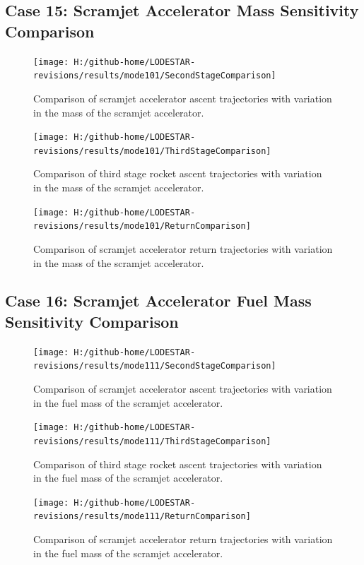 \subsection{Case 15: Scramjet Accelerator Mass Sensitivity Comparison}\label{sec:app_comparison101}
\begin{figure}[!th]
\centering
\texttt{[image: H:/github-home/LODESTAR-revisions/results/mode101/SecondStageComparison]}
\caption{Comparison of scramjet accelerator ascent trajectories with variation in the mass of the scramjet accelerator.}
\label{fig:SecondStageComparison12}
\end{figure}
\begin{figure}[!th]
\centering
\texttt{[image: H:/github-home/LODESTAR-revisions/results/mode101/ThirdStageComparison]}
\caption{Comparison of third stage rocket ascent trajectories with variation in the mass of the scramjet accelerator.}
\label{fig:ThirdStageComparison12}
\end{figure}
\begin{figure}[!th]
\centering
\texttt{[image: H:/github-home/LODESTAR-revisions/results/mode101/ReturnComparison]}
\caption{Comparison of scramjet accelerator return trajectories with variation in the mass of the scramjet accelerator.}
\label{fig:ReturnComparison12}
\end{figure}
\FloatBarrier
\clearpage
\subsection{Case 16: Scramjet Accelerator Fuel Mass Sensitivity Comparison}\label{sec:app_comparison111}
\begin{figure}[!th]
\centering
\texttt{[image: H:/github-home/LODESTAR-revisions/results/mode111/SecondStageComparison]}
\caption{Comparison of scramjet accelerator ascent trajectories with variation in the fuel mass of the scramjet accelerator.}
\label{fig:SecondStageComparison13}
\end{figure}
\begin{figure}[!th]
\centering
\texttt{[image: H:/github-home/LODESTAR-revisions/results/mode111/ThirdStageComparison]}
\caption{Comparison of third stage rocket ascent trajectories with variation in the fuel mass of the scramjet accelerator.}
\label{fig:ThirdStageComparison13}
\end{figure}
\begin{figure}[!th]
\centering
\texttt{[image: H:/github-home/LODESTAR-revisions/results/mode111/ReturnComparison]}
\caption{Comparison of scramjet accelerator return trajectories with variation in the fuel mass of the scramjet accelerator.}
\label{fig:ReturnComparison13}
\end{figure}
\FloatBarrier
\clearpage
